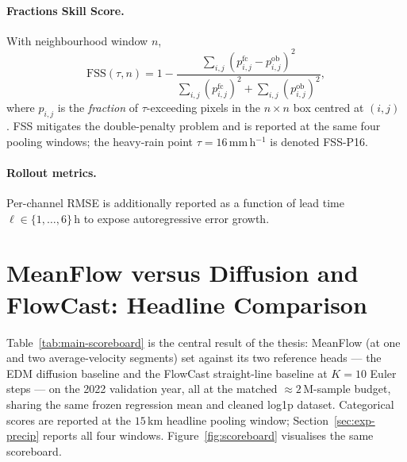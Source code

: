 \paragraph{Fractions Skill Score.} With neighbourhood window $n$,
\begin{equation}
  \mathrm{FSS}(\tau, n) = 1 - \frac{\sum_{i,j}(p^{\text{fc}}_{i,j} - p^{\text{ob}}_{i,j})^2}{\sum_{i,j}(p^{\text{fc}}_{i,j})^2 + \sum_{i,j}(p^{\text{ob}}_{i,j})^2},
\end{equation}
where $p_{i,j}$ is the \emph{fraction} of $\tau$-exceeding pixels in the $n \times n$ box centred at $(i,j)$ \citep{roberts2008fss}. FSS mitigates the double-penalty problem and is reported at the same four pooling windows; the heavy-rain point $\tau = 16$\,mm\,h$^{-1}$ is denoted FSS-P16.

\paragraph{Rollout metrics.} Per-channel RMSE is additionally reported as a function of lead time $\ell \in \{1, \ldots, 6\}$\,h to expose autoregressive error growth.

\section{MeanFlow versus Diffusion and FlowCast: Headline Comparison}
\label{sec:exp-main}

Table~\ref{tab:main-scoreboard} is the central result of the thesis: MeanFlow (at one and two average-velocity segments) set against its two reference heads --- the EDM diffusion baseline and the FlowCast straight-line baseline at $K = 10$ Euler steps --- on the 2022 validation year, all at the matched $\approx 2\,\text{M}$-sample budget, sharing the same frozen regression mean and cleaned log1p dataset. Categorical scores are reported at the $15$\,km headline pooling window; Section~\ref{sec:exp-precip} reports all four windows. Figure~\ref{fig:scoreboard} visualises the same scoreboard.

